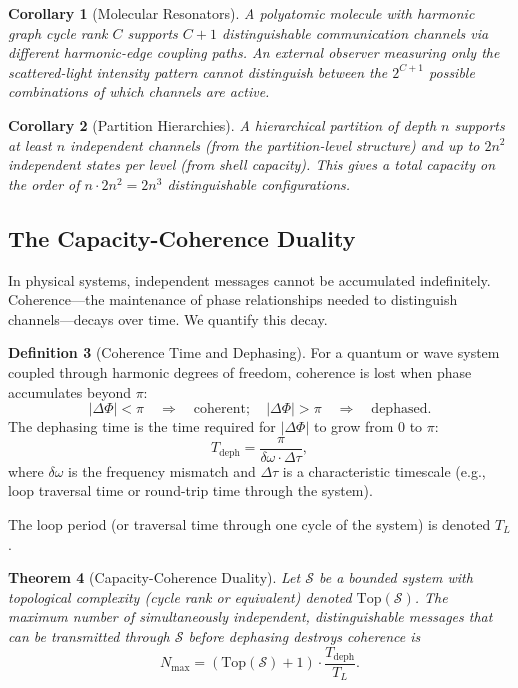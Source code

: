 \documentclass[11pt,twocolumn,a4paper]{article}
\newtheorem{theorem}{Theorem}[section]
\newtheorem{corollary}[theorem]{Corollary}
\theoremstyle{definition}
\newtheorem{definition}[theorem]{Definition}
\newcommand{\abs}[1]{\left|#1\right|}
\begin{document}
\begin{corollary}[Molecular Resonators]
A polyatomic molecule with harmonic graph cycle rank $C$ supports $C+1$ distinguishable communication channels via different harmonic-edge coupling paths. An external observer measuring only the scattered-light intensity pattern cannot distinguish between the $2^{C+1}$ possible combinations of which channels are active.
\end{corollary}

\begin{corollary}[Partition Hierarchies]
A hierarchical partition of depth $n$ supports at least $n$ independent channels (from the partition-level structure) and up to $2n^2$ independent states per level (from shell capacity). This gives a total capacity on the order of $n \cdot 2n^2 = 2n^3$ distinguishable configurations.
\end{corollary}

\subsection{The Capacity-Coherence Duality}

In physical systems, independent messages cannot be accumulated indefinitely. Coherence—the maintenance of phase relationships needed to distinguish channels—decays over time. We quantify this decay.

\begin{definition}[Coherence Time and Dephasing]
For a quantum or wave system coupled through harmonic degrees of freedom, coherence is lost when phase accumulates beyond $\pi$:
\[
\abs{\Delta\Phi} < \pi \quad \Rightarrow \quad \text{coherent};
\quad
\abs{\Delta\Phi} > \pi \quad \Rightarrow \quad \text{dephased}.
\]
The dephasing time is the time required for $\abs{\Delta\Phi}$ to grow from 0 to $\pi$:
\[
T_{\text{deph}} = \frac{\pi}{\delta\omega \cdot \Delta\tau},
\]
where $\delta\omega$ is the frequency mismatch and $\Delta\tau$ is a characteristic timescale (e.g., loop traversal time or round-trip time through the system).

The loop period (or traversal time through one cycle of the system) is denoted $T_L$.
\end{definition}

\begin{theorem}[Capacity-Coherence Duality]
\label{thm:capacity-coherence}
Let $\mathcal{S}$ be a bounded system with topological complexity (cycle rank or equivalent) denoted $\text{Top}(\mathcal{S})$. The maximum number of simultaneously independent, distinguishable messages that can be transmitted through $\mathcal{S}$ before dephasing destroys coherence is
\[
N_{\max} = (\text{Top}(\mathcal{S}) + 1) \cdot \frac{T_{\text{deph}}}{T_L}.
\]
\end{theorem}
\end{document}
